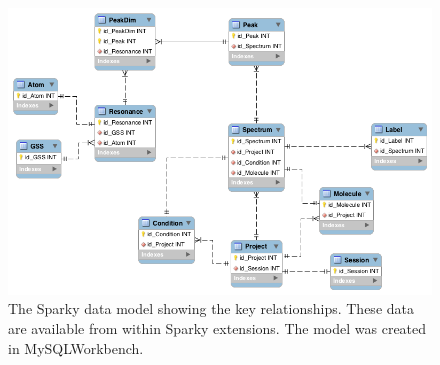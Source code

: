 \begin{figure}
  \includegraphics[scale=0.5]{figures/sparky_model}
  \caption[The Sparky data model]
          {The Sparky data model showing the key relationships.
           These data are available from within Sparky extensions.
           The model was created in MySQLWorkbench.}
  \label{sparky_model}
\end{figure}

